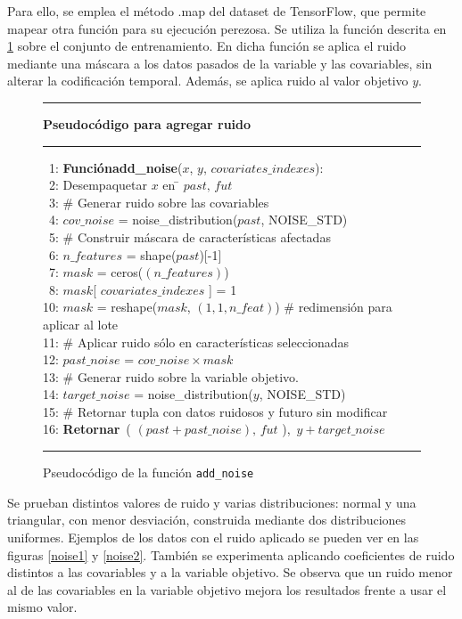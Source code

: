 Para ello, se emplea el método .map del dataset de TensorFlow, que permite mapear otra función para su ejecución perezosa.
Se utiliza la función descrita en \ref{add_noise} sobre el conjunto de entrenamiento. En dicha función se aplica el ruido mediante una máscara
a los datos pasados de la variable y las covariables, sin alterar la codificación temporal. Además, se aplica ruido al valor objetivo $y$.

\begin{figure}[H]
{\small
\hrule
{\bf\small Pseudocódigo para agregar ruido}
\hrule
\begin{center}
\begin{tabbing}
\ 1: {\bf Función}\={\bf add\_noise}($x$, $y$, $covariates\_indexes$): \\
\ 2: \> Desempaquetar $x$ en \= $past,\, fut$ \\
\ 3: \> \# Generar ruido sobre las covariables \\
\ 4: \> $cov\_noise$ = noise\_distribution($past$, NOISE\_STD) \\
\ 5: \> \# Construir máscara de características afectadas \\
\ 6: \> $n\_features$ = shape($past$)[-1] \\
\ 7: \> $mask$ = ceros($(n\_features)$) \\
\ 8: \> $mask$[ $covariates\_indexes$ ] = 1 \\
10: \> $mask$ = reshape($mask$, $(1,1,n\_feat)$)  \# redimensión para aplicar al lote \\
11: \> \# Aplicar ruido sólo en características seleccionadas \\
12: \> $past\_noise$ = $cov\_noise \times mask$ \\
13: \> \# Generar ruido sobre la variable objetivo. \\
14: \> $target\_noise$ = noise\_distribution($y$, NOISE\_STD) \\
15: \> \# Retornar tupla con datos ruidosos y futuro sin modificar \\
16: \> {\bf Retornar}\ ( $(past + past\_noise),\, fut$ ),\ $y + target\_noise$ \\
\end{tabbing}
\end{center}
}
\hrule
\caption{Pseudocódigo de la función \texttt{add\_noise}}
\label{add_noise}
\end{figure}


Se prueban distintos valores de ruido y varias distribuciones: normal y una triangular, con menor desviación, construida mediante dos distribuciones uniformes.
Ejemplos de los datos con el ruido aplicado se pueden ver en las figuras \ref{noise1} y \ref{noise2}. También se experimenta aplicando coeficientes de ruido distintos a las covariables 
y a la variable objetivo. Se observa que un ruido menor al de las covariables en la variable objetivo mejora los resultados frente a usar el mismo valor.

